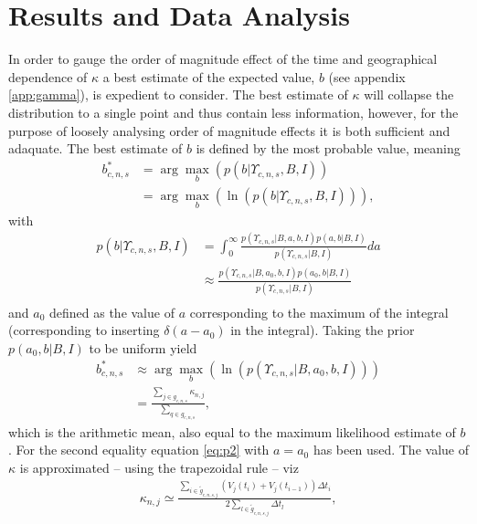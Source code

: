 \documentclass[fleqn,usenatbib,nofootinbib]{revtex4-2}
\begin{document}
	\section{Results and Data Analysis}
	\label{sec:analysis}
	In order to gauge the order of magnitude effect of the time and geographical dependence of $\kappa$ a best estimate of the expected value, $b$ (see appendix \ref{app:gamma}), is expedient to consider. The best estimate of $\kappa$ will collapse the distribution to a single point and thus contain less information, however, for the purpose of loosely analysing order of magnitude effects it is both sufficient and adaquate. The best estimate of $b$ is defined by the most probable value, meaning
	\begin{equation}
		\begin{split}
			b_{c,n,s}^* &= \arg\max_b(p(b|\Upsilon_{c,n,s},B,I))\\
			&= \arg\max_b(\ln(p(b|\Upsilon_{c,n,s},B,I))),
		\end{split}
	\end{equation}
	with
	\begin{equation}
		\begin{split}
			p(b|\Upsilon_{c,n,s},B,I)&=\int_0^\infty \frac{p(\Upsilon_{c,n,s}|B,a,b,I)p(a,b|B,I)}{p(\Upsilon_{c,n,s}|B,I)}da\\
			&\approx \frac{p(\Upsilon_{c,n,s}|B,a_0,b,I)p(a_0,b|B,I)}{p(\Upsilon_{c,n,s}|B,I)}\\
		\end{split}
	\end{equation} 
	and $a_0$ defined as the value of $a$ corresponding to the maximum of the integral (corresponding to inserting $\delta(a-a_0)$ in the integral). Taking the prior $p(a_0,b|B,I)$ to be uniform yield
	\begin{equation}
		\begin{split}
			b_{c,n,s}^* &\approx \arg\max_b(\ln(p(\Upsilon_{c,n,s}|B,a_0,b,I)))\\
			&= \frac{\sum_{j\in g_{c,n,s}}\kappa_{n,j}}{\sum_{q\in g_{c,n,s}}},
		\end{split}
	\end{equation}
	which is the arithmetic mean, also equal to the maximum likelihood estimate of $b$. For the second equality equation \eqref{eq:p2} with $a=a_0$ has been used. The value of $\kappa$ is approximated -- using the trapezoidal rule -- viz
	\begin{equation}
		\begin{split}
			\kappa_{n,j}\simeq \frac{\sum_{i\in \tilde{g}_{c,n,s,j}}(V_{j}(t_i)+V_{j}(t_{i-1}))\Delta t_{i}}{2\sum_{l\in\tilde{g}_{c,n,s,j}}\Delta t_{l}},
		\end{split}
		\label{eq:kappa2}
	\end{equation}
\end{document}
